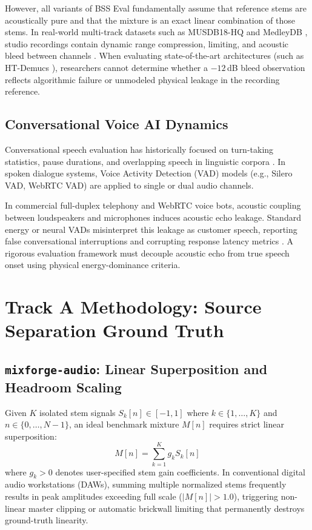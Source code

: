 \documentclass[10pt,journal,compsoc]{IEEEtran}
\begin{document}
However, all variants of BSS Eval fundamentally assume that reference stems are acoustically pure and that the mixture is an exact linear combination of those stems. In real-world multi-track datasets such as MUSDB18-HQ \cite{rafii2017musdb18} and MedleyDB \cite{bittner2014medleydb}, studio recordings contain dynamic range compression, limiting, and acoustic bleed between channels \cite{cano2018musical}. When evaluating state-of-the-art architectures (such as HT-Demucs \cite{rouard2023hybrid}), researchers cannot determine whether a $-12$\,dB bleed observation reflects algorithmic failure or unmodeled physical leakage in the recording reference.

\subsection{Conversational Voice AI Dynamics}
Conversational speech evaluation has historically focused on turn-taking statistics, pause durations, and overlapping speech in linguistic corpora \cite{heldner2010pauses,levinson2015turn,godfrey1992switchboard}. In spoken dialogue systems, Voice Activity Detection (VAD) models (e.g., Silero VAD, WebRTC VAD) are applied to single or dual audio channels. 

In commercial full-duplex telephony and WebRTC voice bots, acoustic coupling between loudspeakers and microphones induces acoustic echo leakage. Standard energy or neural VADs misinterpret this leakage as customer speech, reporting false conversational interruptions and corrupting response latency metrics \cite{skantze2021turn}. A rigorous evaluation framework must decouple acoustic echo from true speech onset using physical energy-dominance criteria.

\section{Track A Methodology: Source Separation Ground Truth}

\subsection{\texttt{mixforge-audio}: Linear Superposition and Headroom Scaling}
Given $K$ isolated stem signals $S_k[n] \in [-1, 1]$ where $k \in \{1, \dots, K\}$ and $n \in \{0, \dots, N-1\}$, an ideal benchmark mixture $M[n]$ requires strict linear superposition:
\begin{equation}
M[n] = \sum_{k=1}^K g_k S_k[n]
\end{equation}
where $g_k > 0$ denotes user-specified stem gain coefficients. In conventional digital audio workstations (DAWs), summing multiple normalized stems frequently results in peak amplitudes exceeding full scale ($|M[n]| > 1.0$), triggering non-linear master clipping or automatic brickwall limiting that permanently destroys ground-truth linearity.
\end{document}
